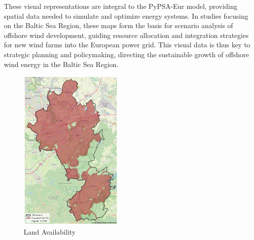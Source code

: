These visual representations are integral to the PyPSA-Eur model, providing spatial data needed to simulate and optimize energy systems. In studies focusing on the Baltic Sea Region, these maps form the basis for scenario analysis of offshore wind development, guiding resource allocation and integration strategies for new wind farms into the European power grid. This visual data is thus key to strategic planning and policymaking, directing the sustainable growth of offshore wind energy in the Baltic Sea Region.

\begin{figure}[htp]
    \centering
    \includegraphics[width=0.45\textwidth]{Figure/land_availability.png}
    \caption{Land Availability}
    \label{fig:land_availability}
\end{figure}


